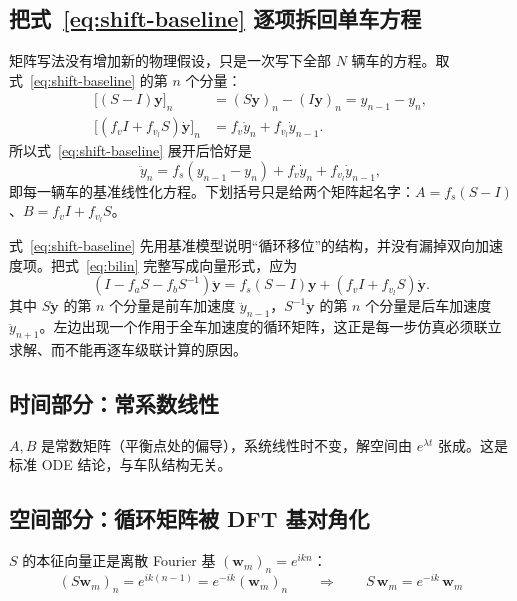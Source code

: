 \documentclass[11pt,a4paper,openany]{book}
\numberwithin{equation}{chapter}
\numberwithin{figure}{chapter}
\numberwithin{table}{chapter}
\begin{document}
\subsection{把式~\eqref{eq:shift-baseline} 逐项拆回单车方程}

矩阵写法没有增加新的物理假设，只是一次写下全部 $N$ 辆车的方程。取式~\eqref{eq:shift-baseline} 的第 $n$ 个分量：
\begin{align}
\bigl[(S-I)\mathbf y\bigr]_n
&=(S\mathbf y)_n-(I\mathbf y)_n=y_{n-1}-y_n,\\
\bigl[(f_vI+f_{v_l}S)\dot{\mathbf y}\bigr]_n
&=f_v\dot y_n+f_{v_l}\dot y_{n-1}.
\end{align}
所以式~\eqref{eq:shift-baseline} 展开后恰好是
\begin{equation}
\ddot y_n=f_s(y_{n-1}-y_n)+f_v\dot y_n+f_{v_l}\dot y_{n-1},
\end{equation}
即每一辆车的基准线性化方程。下划括号只是给两个矩阵起名字：$A=f_s(S-I)$、$B=f_vI+f_{v_l}S$。

\begin{tcolorbox}[notebox,title=\textbf{为什么式~\eqref{eq:shift-baseline} 暂时没有写 $f_a$ 和 $f_b$}]
式~\eqref{eq:shift-baseline} 先用基准模型说明“循环移位”的结构，并没有漏掉双向加速度项。把式~\eqref{eq:bilin} 完整写成向量形式，应为
\begin{equation}
\left(I-f_aS-f_bS^{-1}\right)\ddot{\mathbf y}
=f_s(S-I)\mathbf y+\left(f_vI+f_{v_l}S\right)\dot{\mathbf y}.
\label{eq:bilin-shift}
\end{equation}
其中 $S\ddot{\mathbf y}$ 的第 $n$ 个分量是前车加速度 $\ddot y_{n-1}$，$S^{-1}\ddot{\mathbf y}$ 的第 $n$ 个分量是后车加速度 $\ddot y_{n+1}$。左边出现一个作用于全车加速度的循环矩阵，这正是每一步仿真必须联立求解、而不能再逐车级联计算的原因。
\end{tcolorbox}

\subsection{时间部分：常系数线性}

$A,B$ 是常数矩阵（平衡点处的偏导），系统线性时不变，解空间由 $e^{\lambda t}$ 张成。这是标准 ODE 结论，与车队结构无关。

\subsection{空间部分：循环矩阵被 DFT 基对角化}

$S$ 的本征向量正是离散 Fourier 基 $\left(\mathbf w_m\right)_n = e^{ikn}$：
\begin{equation}
\left(S\mathbf w_m\right)_n = e^{ik(n-1)} = e^{-ik}\left(\mathbf w_m\right)_n
\qquad\Longrightarrow\qquad
S\,\mathbf w_m = e^{-ik}\,\mathbf w_m
\end{equation}
\end{document}
